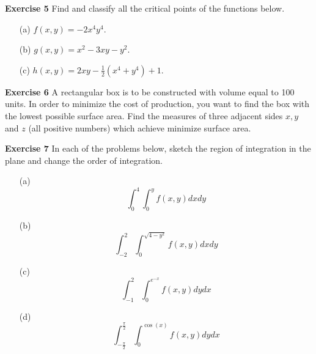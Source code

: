 \documentclass[12pt,oneside]{exam}
\newenvironment{exercise}[1]{\vspace{.1in}\noindent\textbf{Exercise #1 \hspace{.05em}}}{}
\begin{document}
\begin{exercise}{5}
Find and classify all the critical points of the functions below. 
\begin{itemize}
\item[(a)] $f(x,y)=-2x^4y^4$. 
\item[(b)] $g(x,y)=x^2-3xy-y^2$. 
\item[(c)] $h(x,y)=2xy-\frac{1}{2}(x^4+y^4) +1$.  
\end{itemize}
\end{exercise}

\begin{exercise}{6}
A rectangular box is to be constructed with volume equal to 100 units. In order to minimize the cost of production, you want to find the box with the lowest possible surface area. Find the measures of three adjacent sides $x,y$ and $z$ (all positive numbers) which achieve minimize surface area.
\end{exercise}

\begin{exercise}{7}
In each of the problems below, sketch the region of integration in the plane and change the order of integration. 
\begin{itemize}
\item[(a)] 
\begin{equation*}
\int_{0}^{4} \int_{0}^{y} f(x,y) dx dy
\end{equation*}
\item[(b)] 
\begin{equation*}
\int_{-2}^{2} \int_{0}^{\sqrt{4-y^2}} f(x,y) dx dy
\end{equation*}
\item[(c)] 
\begin{equation*}
\int_{-1}^{2} \int_{0}^{e^{-x}} f(x,y) dy dx
\end{equation*}
\item[(d)] 
\begin{equation*}
\int_{-\frac{\pi}{2}}^{\frac{\pi}{2}} \int_{0}^{\cos(x)} f(x,y) dy dx
\end{equation*}
\end{itemize}
\end{exercise}
\end{document}
